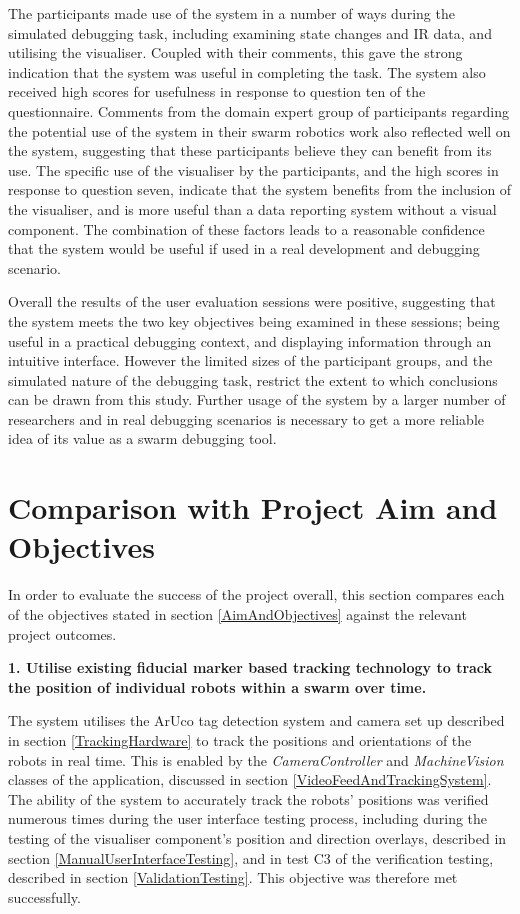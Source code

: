 The participants made use of the system in a number of ways during the simulated debugging task, including examining state changes and IR data, and utilising the visualiser. Coupled with their comments, this gave the strong indication that the system was useful in completing the task. The system also received high scores for usefulness in response to question ten of the questionnaire. Comments from the domain expert group of participants regarding the potential use of the system in their swarm robotics work also reflected well on the system, suggesting that these participants believe they can benefit from its use. The specific use of the visualiser by the participants, and the high scores in response to question seven, indicate that the system benefits from the inclusion of the visualiser, and is more useful than a data reporting system without a visual component. The combination of these factors leads to a reasonable confidence that the system would be useful if used in a real development and debugging scenario.

Overall the results of the user evaluation sessions were positive, suggesting that the system meets the two key objectives being examined in these sessions; being useful in a practical debugging context, and displaying information through an intuitive interface. However the limited sizes of the participant groups, and the simulated nature of the debugging task, restrict the extent to which conclusions can be drawn from this study. Further usage of the system by a larger number of researchers and in real debugging scenarios is necessary to get a more reliable idea of its value as a swarm debugging tool.


\section{Comparison with Project Aim and Objectives}

In order to evaluate the success of the project overall, this section compares each of the objectives stated in section \ref{AimAndObjectives} against the relevant project outcomes.

\noindent \textbf{1. Utilise existing fiducial marker based tracking technology to track the position of individual robots within a swarm over time.}

The system utilises the ArUco tag detection system and camera set up described in section \ref{TrackingHardware} to track the positions and orientations of the robots in real time. This is enabled by the \textit{CameraController} and \textit{MachineVision} classes of the application, discussed in section \ref{VideoFeedAndTrackingSystem}. The ability of the system to accurately track the robots' positions was verified numerous times during the user interface testing process, including during the testing of the visualiser component's position and direction overlays, described in section \ref{ManualUserInterfaceTesting}, and in test C3 of the verification testing, described in section \ref{ValidationTesting}. This objective was therefore met successfully.

